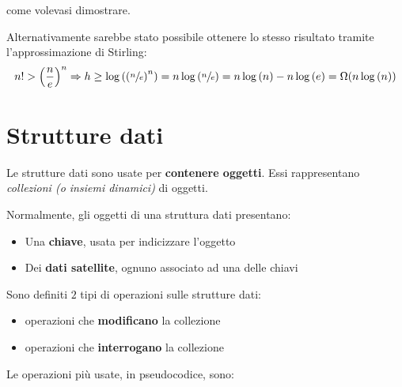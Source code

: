 \documentclass[italian, 10pt]{article}
\begin{document}
come volevasi dimostrare.

\bigskip
Alternativamente sarebbe stato possibile ottenere lo stesso risultato tramite l'approssimazione di Stirling:
\[ n! > \left(\dfrac{n}{e}\right)^n \Rightarrow h \geq \log\left(\left(\sfrac{n}{e}\right)^n\right) = n \log\left(\sfrac{n}{e}\right) = n \log{(n)} - n \log{(e)} = \Omega(n \log{(n)})\]

\clearpage

\section{Strutture dati}

Le strutture dati sono usate per \textbf{contenere oggetti}.
Essi rappresentano \textit{collezioni (o insiemi dinamici)} di oggetti.

Normalmente, gli oggetti di una struttura dati presentano:

\begin{itemize}
  \item Una \textbf{chiave}, usata per indicizzare l'oggetto
  \item Dei \textbf{dati satellite}, ognuno associato ad una delle chiavi
\end{itemize}

Sono definiti \(2\) tipi di operazioni sulle strutture dati:

\begin{itemize}
  \item operazioni che \textbf{modificano} la collezione
  \item operazioni che \textbf{interrogano} la collezione
\end{itemize}

\bigskip
Le operazioni più usate, in pseudocodice, sono:
\end{document}
